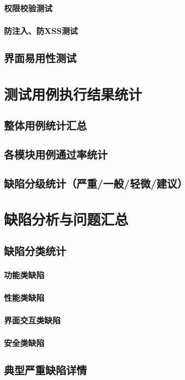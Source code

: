 \documentclass{../template/softeng}
\begin{document}
\subsubsection{权限校验测试}
\subsubsection{防注入、防XSS测试}
\subsection{界面易用性测试}

\section{测试用例执行结果统计}
\subsection{整体用例统计汇总}
\subsection{各模块用例通过率统计}
\subsection{缺陷分级统计（严重/一般/轻微/建议）}

\section{缺陷分析与问题汇总}
\subsection{缺陷分类统计}
\subsubsection{功能类缺陷}
\subsubsection{性能类缺陷}
\subsubsection{界面交互类缺陷}
\subsubsection{安全类缺陷}
\subsection{典型严重缺陷详情}
\end{document}
